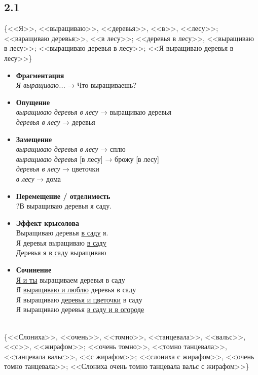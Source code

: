 \documentclass[14pt,extrafontsizes]{article}
\begin{document}
\subsection*{2.1}
\{<<Я>>, <<выращиваю>>, <<деревья>>, <<в>>, <<лесу>>; <<варащиваю деревья>>, <<в лесу>>; <<деревья в лесу>>, <<выращиваю в лесу>>; <<выращиваю деревья в лесу>>; <<Я выращиваю деревья в лесу>>\}
\begin{itemize}
    \item \textbf{Фрагментация}\\
    \textit{Я выращиваю...} → Что выращиваешь?
    \item \textbf{Опущение}\\
    \textit{выращиваю деревья в лесу} → выращиваю деревья\\
    \textit{деревья в лесу} → деревья
    \item \textbf{Замещение} \\
    \textit{выращиваю деревья в лесу} → сплю\\
    \textit{выращиваю деревья} [в лесу] → брожу [в лесу]\\
    \textit{деревья в лесу} → цветочки\\
    \textit{в лесу} → дома
    \item \textbf{Перемещение / отделимость}\\
    ?В выращиваю деревья я саду.
    \item \textbf{Эффект крысолова}\\
    Выращиваю деревья \underline{в саду} я.\\ 
    Я деревья выращиваю \underline{в саду}\\
    Деревья я \underline{в саду} выращиваю
    \item \textbf{Сочинение}\\
    \underline{Я и ты} выращиваем деревья в саду\\
    Я \underline{выращиваю и люблю} деревья в саду\\
    Я выращиваю \underline{деревья и цветочки} в саду\\
    Я выращиваю деревья \underline{в саду и в огороде}
\end{itemize}
\\
\{<<Слониха>>, <<очень>>, <<томно>>, <<танцевала>>, <<вальс>>, <<с>>, <<жирафом>>; <<очень томно>>, <<томно танцевала>>, <<танцевала вальс>>, <<с жирафом>>; <<слониха с жирафом>>, <<очень томно танцевала>>; <<Слониха очень томно танцевала вальс с жирафом>>\}
\end{document}
